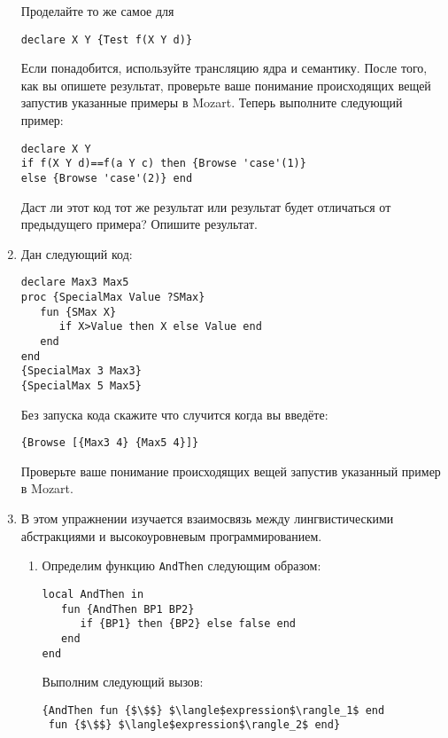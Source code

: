 \begin{enumerate}
{Проделайте то же самое для

\begin{lstlisting}
declare X Y {Test f(X Y d)}
\end{lstlisting}

Если понадобится, используйте трансляцию ядра и семантику. После того, как вы опишете результат, проверьте ваше понимание происходящих вещей запустив указанные примеры в Mozart. Теперь выполните следующий пример:

\begin{lstlisting}
declare X Y
if f(X Y d)==f(a Y c) then {Browse 'case'(1)}
else {Browse 'case'(2)} end
\end{lstlisting}

Даст ли этот код тот же результат или результат будет отличаться от предыдущего примера? Опишите результат.}

\item{Дан следующий код:

  \begin{lstlisting}
declare Max3 Max5
proc {SpecialMax Value ?SMax}
   fun {SMax X}
      if X>Value then X else Value end
   end
end
{SpecialMax 3 Max3}
{SpecialMax 5 Max5}
  \end{lstlisting}
  
Без запуска кода скажите что случится когда вы введёте:

\begin{lstlisting}
{Browse [{Max3 4} {Max5 4}]}
\end{lstlisting}

Проверьте ваше понимание происходящих вещей запустив указанный пример в Mozart.}

\item{В этом упражнении изучается взаимосвязь между лингвистическими абстракциями и высокоуровневым программированием.

  \begin{enumerate}
\item{Определим функцию \lstinline!AndThen! следующим образом:

  \begin{lstlisting}
local AndThen in
   fun {AndThen BP1 BP2}
      if {BP1} then {BP2} else false end
   end
end
  \end{lstlisting}
  
Выполним следующий вызов:

\begin{lstlisting}
{AndThen fun {$\$$} $\langle$expression$\rangle_1$ end
 fun {$\$$} $\langle$expression$\rangle_2$ end}
\end{lstlisting}

}
\end{enumerate}}
\end{enumerate}
